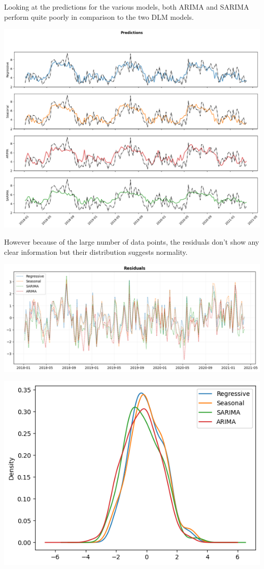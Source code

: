 \documentclass[a4paper,12pt]{article}
\begin{document}
Looking at the predictions for the various models, both ARIMA and SARIMA perform quite poorly in comparison to the two DLM models.

\begin{center}
\includegraphics[width=1.00\textwidth]{./images/tiru/weeklyPred.png}
\end{center}

However because of the large number of data points, the residuals don't show any clear information but their distribution suggests normality.

\begin{center}
\includegraphics[width=1.00\textwidth]{./images/tiru/weeklyResid.png}
\end{center}

\begin{center}
\includegraphics[width=0.8\linewidth]{./images/tiru/weeklyDist.png}
\end{center}
\end{document}
